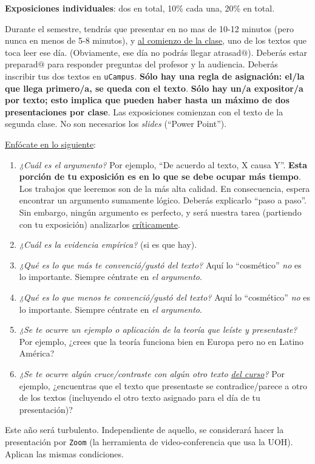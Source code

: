 \documentclass[letterpaper]{article}
\renewenvironment{itemize}{
  \begin{list}{}{
    \setlength{\leftmargin}{1.5em}
  }
}{
  \end{list}
}
\begin{document}
\begin{enumerate}
	\item {\bf Exposiciones individuales}: dos en total, 10\% cada una, 20\% en total.

	Durante el semestre, tendr\'as que presentar en no mas de 10-12 minutos (pero nunca en menos de 5-8 minutos), y \underline{al comienzo de la clase}, uno de los textos que toca leer ese d\'ia. (Obviamente, ese d\'ia no podr\'as llegar atrasad$@$). Deber\'as estar preparad$@$ para responder preguntas del profesor y la audiencia. Deber\'as inscribir tus dos textos en \texttt{uCampus}. {\bf S\'olo hay una regla de asignaci\'on: el/la que llega primero/a, se queda con el texto}. {\bf S\'olo hay un/a expositor/a por texto; esto implica que pueden haber hasta un m\'aximo de dos presentaciones por clase}. Las exposiciones comienzan con el texto de la segunda clase. No son necesarios los \emph{slides} (``Power Point''). 

	\underline{Enf\'ocate en lo siguiente}:

		\begin{enumerate}
			\item \emph{¿Cu\'al es el argumento?} Por ejemplo, ``De acuerdo al texto, X causa Y''. {\bf Esta porci\'on de tu exposici\'on es en lo que se debe ocupar m\'as tiempo}. Los trabajos que leeremos son de la m\'as alta calidad. En consecuencia, espera encontrar un argumento sumamente l\'ogico. Deber\'as explicarlo ``paso a paso''. Sin embargo, ning\'un argumento es perfecto, y ser\'a nuestra tarea (partiendo con tu exposici\'on) analizarlos \underline{cr\'iticamente}. 
			\item \emph{¿Cu\'al es la evidencia emp\'irica?} (si es que hay).
			\item \emph{¿Qu\'e es lo que m\'as te convenci\'o/gust\'o del texto?} Aqu\'i lo ``cosm\'etico'' \emph{no} es lo importante. Siempre c\'entrate en \emph{el argumento}.
			\item \emph{¿Qu\'e es lo que menos te convenci\'o/gust\'o del texto?} Aqu\'i lo ``cosm\'etico'' \emph{no} es lo importante. Siempre c\'entrate en \emph{el argumento}.
			\item \emph{¿Se te ocurre un ejemplo o aplicaci\'on de la teor\'ia que le\'iste y presentaste?} Por ejemplo, ¿crees que la teor\'ia funciona bien en Europa pero no en Latino Am\'erica?
			\item \emph{¿Se te ocurre alg\'un cruce/contraste con alg\'un otro texto \underline{del curso}?} Por ejemplo, ¿encuentras que el texto que presentaste se contradice/parece a otro de los textos (incluyendo el otro texto asignado para el d\'ia de tu presentaci\'on)?
		\end{enumerate}

	\begin{itemize}
		\item[{\color{red}\Pointinghand}] Este a\~no ser\'a turbulento. Independiente de aquello, se considerar\'a hacer la presentaci\'on por \texttt{Zoom} (la herramienta de video-conferencia que usa la UOH). Aplican las mismas condiciones.
	\end{itemize}


\end{enumerate}
\end{document}
